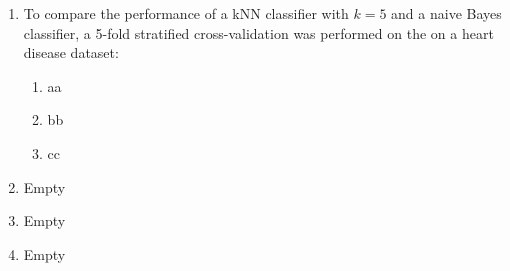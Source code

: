 \documentclass[12pt]{article}
\begin{document}
\begin{enumerate}[leftmargin=\labelsep, label=\textbf{\arabic*.)}]
    \item To compare the performance of a kNN classifier with $k=5$ and a naive Bayes classifier, a 5-fold stratified cross-validation was performed on the on a heart disease dataset:

        \begin{enumerate}[label=\textbf{\alph*.)}]
            \item aa
            \item bb
            \item cc 
        \end{enumerate}

    \item Empty

    \item Empty 

    \item Empty 
    
\end{enumerate}
\end{document}
